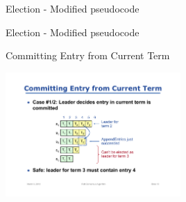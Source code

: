 \begin{frame}{Election - Modified pseudocode}

\begin{Procedure}
\caption{RPC timeout code - executed by process $p$}

\end{Procedure}
\end{frame}

\begin{frame}{Election - Modified pseudocode}

\begin{Procedure}
\caption{Election code - executed by process $p$}

\end{Procedure}
\end{frame}

\begin{frame}[t]{Committing Entry from Current Term}


\begin{center}
\includegraphics[width=0.5\textwidth]{commit1}
\end{center}


\end{frame}

